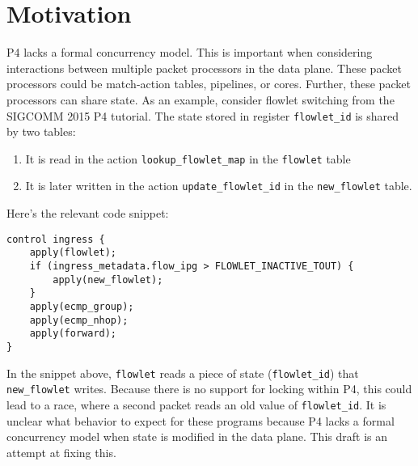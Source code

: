 \section{Motivation}
P4 lacks a formal concurrency model. This is important when considering
interactions between multiple packet processors in the data plane. These packet
processors could be match-action tables, pipelines, or cores. Further, these
packet processors can share state. As an example, consider flowlet switching
from the SIGCOMM 2015 P4 tutorial. The state stored in register
\texttt{flowlet\_id} is shared by two tables:

\begin{enumerate}

\item It is read in the action \texttt{lookup\_flowlet\_map} in the
\texttt{flowlet} table

\item It is later written in the action \texttt{update\_flowlet\_id} in the
\texttt{new\_flowlet} table.

\end{enumerate}

Here's the relevant code snippet:
\begin{verbatim}
control ingress {
    apply(flowlet);
    if (ingress_metadata.flow_ipg > FLOWLET_INACTIVE_TOUT) {
        apply(new_flowlet);
    }
    apply(ecmp_group);
    apply(ecmp_nhop);
    apply(forward);
}
\end{verbatim}
In the snippet above, \texttt{flowlet} reads a piece of state
(\texttt{flowlet\_id}) that \texttt{new\_flowlet} writes. Because there is no
support for locking within P4, this could lead to a race, where a second packet
reads an old value of \texttt{flowlet\_id}. It is unclear what behavior to
expect for these programs because P4 lacks a formal concurrency model when
state is modified in the data plane. This draft is an attempt at fixing this.


